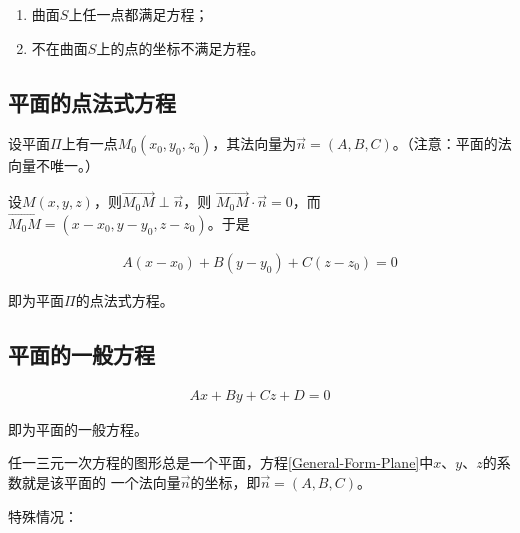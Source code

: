 \documentclass[12pt, a4paper]{article}
\numberwithin{equation}{section}
\begin{document}
    \begin{enumerate}
        \item 曲面\(S\)上任一点都满足方程；
        \item 不在曲面\(S\)上的点的坐标不满足方程。
    \end{enumerate}

\subsection{平面的点法式方程}

    设平面\(\mathit{\Pi}\)上有一点\(M_{0}\left(x_0,y_0,z_0\right)\)，其法向量为\(\overrightarrow{n} = \left(
    A, B, C\right)\)。（注意：平面的法向量不唯一。）
    
    设\(M\left(x,y,z\right)\)，则\(\overrightarrow{M_{0}M} \perp \overrightarrow{n}\)，则
    \(\overrightarrow{M_{0}M} \cdot \overrightarrow{n} = 0\)，而\(\overrightarrow{M_{0}M} =
    \left(x-x_0,y-y_0,z-z_0\right)\)。于是
    
    \begin{align}
        A\left(x-x_0\right) + B\left(y-y_0\right) + C\left(z-z_0\right) = 0
        \label{Point-Normal-Plane}
    \end{align}
    
    即为平面\(\mathit{\Pi}\)的点法式方程。

\subsection{平面的一般方程}

    \begin{align}
        Ax + By + Cz + D = 0
        \label{General-Form-Plane}
    \end{align}

    即为平面的一般方程。

    任一三元一次方程的图形总是一个平面，方程\ref{General-Form-Plane}中\(x\)、\(y\)、\(z\)的系数就是该平面的
    一个法向量\(\overrightarrow{n}\)的坐标，即\(\overrightarrow{n} = \left(A, B, C\right)\)。

    特殊情况：
\end{document}

